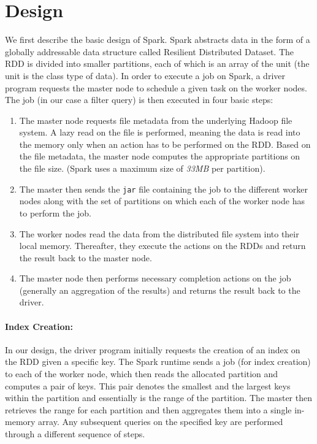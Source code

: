 \section{Design} 
\label{sec:design}
We first describe the basic design of Spark. Spark abstracts data in the
form of a globally addressable data structure called Resilient
Distributed Dataset. The RDD is divided into smaller partitions, each of
which is an array of the unit (the unit is the class type of data).  In
order to execute a job on Spark, a driver program requests the master
node to schedule a given task on the worker nodes. The job (in our case
a filter query) is then executed in four basic steps: 
\begin{enumerate}
\item The master node requests file metadata from the underlying Hadoop
    file system. A lazy read on the file is performed, meaning the data
    is read into the memory only when an action has to be performed on
    the RDD. Based on the file metadata, the master node computes the
    appropriate partitions on the file size. (Spark uses a maximum size
    of \emph{33MB} per partition). 
\item The master then sends the \texttt{jar} file containing the job to
    the different worker nodes along with the set of partitions on which
    each of the worker node has to perform the job. 
\item The worker nodes read the data from the distributed file system
    into their local memory. Thereafter, they execute the actions on the
    RDDs and return the result back to the master node.
\item The master node then performs necessary completion actions on the
    job (generally an aggregation of the results) and returns the result
    back to the driver.
\end{enumerate}

\paragraph{Index Creation:}
In our design, the driver program initially requests the creation of an
index on the RDD given a specific key.  The Spark runtime sends a job
(for index creation) to each of the worker node, which then reads the
allocated partition and computes a pair of keys.  This pair denotes the
smallest and the largest keys within the partition and essentially is
the range of the partition.  The master then retrieves the range for
each partition and then aggregates them into a single in-memory array.
Any subsequent queries on the specified key are performed through a
different sequence of steps.

